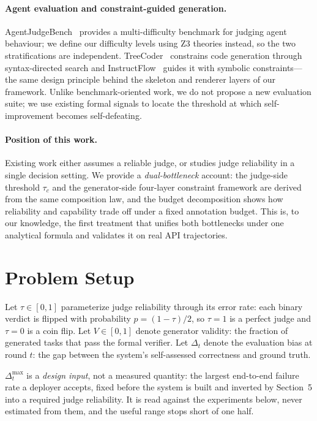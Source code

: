 \documentclass{article}
\begin{document}
\paragraph{Agent evaluation and constraint-guided generation.}
AgentJudgeBench~\cite{agentjudgebench} provides a multi-difficulty benchmark for judging agent behaviour; we define our difficulty levels using Z3 theories instead, so the two stratifications are independent. TreeCoder~\cite{treecoder} constrains code generation through syntax-directed search and InstructFlow~\cite{instructflow} guides it with symbolic constraints---the same design principle behind the skeleton and renderer layers of our framework. Unlike benchmark-oriented work, we do not propose a new evaluation suite; we use existing formal signals to locate the threshold at which self-improvement becomes self-defeating.

\paragraph{Position of this work.}
Existing work either assumes a reliable judge, or studies judge reliability in a single decision setting. We provide a \emph{dual-bottleneck} account: the judge-side threshold $\tau_c$ and the generator-side four-layer constraint framework are derived from the same composition law, and the budget decomposition shows how reliability and capability trade off under a fixed annotation budget. This is, to our knowledge, the first treatment that unifies both bottlenecks under one analytical formula and validates it on real API trajectories.

\section{Problem Setup}

Let $\tau \in [0,1]$ parameterize judge reliability through its error rate: each binary verdict is
flipped with probability $p = (1-\tau)/2$, so $\tau = 1$ is a perfect judge and $\tau = 0$ is a coin
flip. Let $V \in [0,1]$ denote generator validity: the fraction of generated tasks that pass the
formal verifier. Let $\Delta_t$ denote the evaluation bias at round $t$: the gap between the system's
self-assessed correctness and ground truth.

$\Delta_t^{\max}$ is a \emph{design input}, not a measured quantity: the largest end-to-end failure
rate a deployer accepts, fixed before the system is built and inverted by Section~5 into a required
judge reliability. It is read against the experiments below, never estimated from them, and the
useful range stops short of one half.
\end{document}
